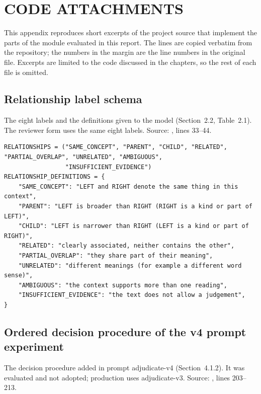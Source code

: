 \chapter{CODE ATTACHMENTS}
\label{app:code}

This appendix reproduces short excerpts of the project source that implement the parts of the module evaluated in this report. The lines are copied verbatim from the repository; the numbers in the margin are the line numbers in the original file. Excerpts are limited to the code discussed in the chapters, so the rest of each file is omitted.

\section{Relationship label schema}
\label{app:A1}
The eight labels and the definitions given to the model (Section~2.2, Table~2.1). The reviewer form uses the same eight labels. Source: , lines 33--44.

\begin{lstlisting}[style=repo, firstnumber=33]
RELATIONSHIPS = ("SAME_CONCEPT", "PARENT", "CHILD", "RELATED", "PARTIAL_OVERLAP", "UNRELATED", "AMBIGUOUS",
                 "INSUFFICIENT_EVIDENCE")
RELATIONSHIP_DEFINITIONS = {
    "SAME_CONCEPT": "LEFT and RIGHT denote the same thing in this context",
    "PARENT": "LEFT is broader than RIGHT (RIGHT is a kind or part of LEFT)",
    "CHILD": "LEFT is narrower than RIGHT (LEFT is a kind or part of RIGHT)",
    "RELATED": "clearly associated, neither contains the other",
    "PARTIAL_OVERLAP": "they share part of their meaning",
    "UNRELATED": "different meanings (for example a different word sense)",
    "AMBIGUOUS": "the context supports more than one reading",
    "INSUFFICIENT_EVIDENCE": "the text does not allow a judgement",
}
\end{lstlisting}

\section{Ordered decision procedure of the v4 prompt experiment}
\label{app:A2}
The decision procedure added in prompt adjudicate-v4 (Section~4.1.2). It was evaluated and not adopted; production uses adjudicate-v3. Source: , lines 203--213.

